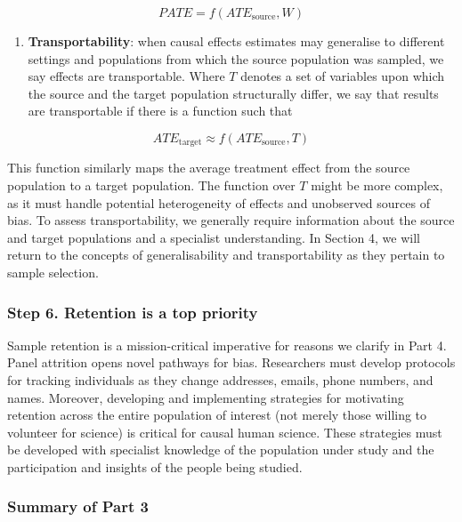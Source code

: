 \documentclass[
  singlecolumn]{article}
\providecommand{\tightlist}{%
  \setlength{\itemsep}{0pt}\setlength{\parskip}{0pt}}\usepackage{longtable,booktabs,array}
\begin{document}
\[PATE =  f(ATE_{\text{source}}, W)\]

\begin{enumerate}
\def\labelenumi{\arabic{enumi}.}
\setcounter{enumi}{3}
\tightlist
\item
  \textbf{Transportability}: when causal effects estimates may
  generalise to different settings and populations from which the source
  population was sampled, we say effects are transportable. Where \(T\)
  denotes a set of variables upon which the source and the target
  population structurally differ, we say that results are transportable
  if there is a function such that
\end{enumerate}

\[ATE_{\text{target}} \approx f(ATE_{\text{source}}, T)\]

This function similarly maps the average treatment effect from the
source population to a target population. The function over \(T\) might
be more complex, as it must handle potential heterogeneity of effects
and unobserved sources of bias. To assess transportability, we generally
require information about the source and target populations and a
specialist understanding. In Section 4, we will return to the concepts
of generalisability and transportability as they pertain to sample
selection.

\hypertarget{step-6.-retention-is-a-top-priority}{%
\subsubsection{Step 6. Retention is a top
priority}\label{step-6.-retention-is-a-top-priority}}

Sample retention is a mission-critical imperative for reasons we clarify
in Part 4. Panel attrition opens novel pathways for bias. Researchers
must develop protocols for tracking individuals as they change
addresses, emails, phone numbers, and names. Moreover, developing and
implementing strategies for motivating retention across the entire
population of interest (not merely those willing to volunteer for
science) is critical for causal human science. These strategies must be
developed with specialist knowledge of the population under study and
the participation and insights of the people being studied.

\hypertarget{summary-of-part-3}{%
\subsubsection{Summary of Part 3}\label{summary-of-part-3}}
\end{document}
